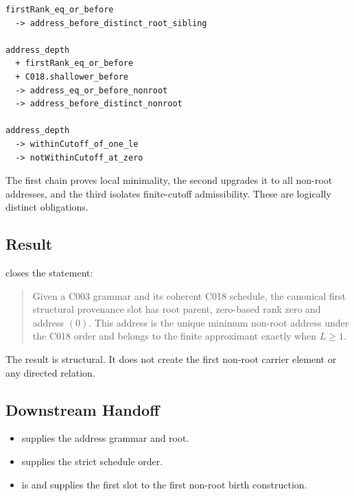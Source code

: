 \begin{verbatim}
firstRank_eq_or_before
  -> address_before_distinct_root_sibling

address_depth
  + firstRank_eq_or_before
  + C018.shallower_before
  -> address_eq_or_before_nonroot
  -> address_before_distinct_nonroot

address_depth
  -> withinCutoff_of_one_le
  -> notWithinCutoff_at_zero
\end{verbatim}

The first chain proves local minimality, the second upgrades it to all
non-root addresses, and the third isolates finite-cutoff admissibility.
These are logically distinct obligations.

\subsection{Result}\label{result-7}

\texttt{\protect{}} closes the statement:

\begin{quote}
Given a C003 grammar and its coherent C018 schedule, the canonical first
structural provenance slot has root parent, zero-based rank zero and
address \((0)\). This address is the unique minimum non-root address
under the C018 order and belongs to the finite approximant exactly when
\(L\ge1\).
\end{quote}

The result is structural. It does not create the first non-root carrier
element or any directed relation.

\subsection{Downstream Handoff}\label{downstream-handoff-7}

\begin{itemize}
\tightlist
\item
  \texttt{\protect{}} supplies the address
  grammar and root.
\item
  \texttt{\protect{}} supplies the strict
  schedule order.
\item
  \texttt{\protect{}} is
  \texttt{\protect{}} and supplies the first slot to the first
  non-root birth construction.
\end{itemize}

